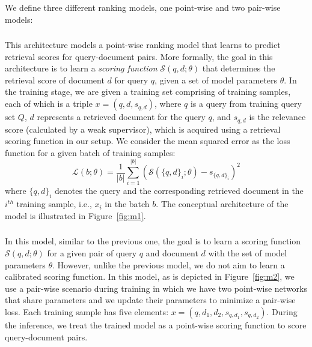We define three different ranking models, one point-wise and two pair-wise models:

\subsubsection{\label{sec:modelone}\ModelOne} 
This architecture models a point-wise ranking model that learns to predict retrieval scores for query-document pairs. More formally, the goal in this architecture is to learn a \emph{scoring function} $\mathcal{S}(q, d; \theta)$ that determines the retrieval score of document $d$ for query $q$, given a set of model parameters $\theta$.
%
In the training stage, we are given a training set comprising of training samples, each of which is a triple $x = (q,d, s_{q,d})$, where $q$ is a query from training query set $Q$, $d$ represents a retrieved document for the query $q$, and $s_{q,d}$ is the relevance score (calculated by a weak supervisor), which is acquired using a retrieval scoring function in our setup.
%
We consider the mean squared error as the loss function for a given batch of training samples:
\begin{equation}
\mathcal{L}(b; \theta) = \frac{1}{|b|} \sum_{i=1}^{|b|}{(\mathcal{S}(\{q, d\}_i; \theta) - s_{\{q, d\}_i})^2}
\end{equation}
where $\{q, d\}_i$ denotes the query and the corresponding retrieved document in the $i^{th}$ training sample, i.e., $x_i$ in the batch $b$.
The conceptual architecture of the model is illustrated in Figure~\ref{fig:m1}.


\subsubsection{\label{sec:modeltwo}\ModelTwo}
In this model, similar to the previous one, the goal is to learn a scoring function $\mathcal{S}(q, d; \theta)$ for a given pair of query $q$ and document $d$ with the set of model parameters $\theta$. 
However, unlike the previous model, we do not aim to learn a calibrated scoring function. 
In this model, as is depicted in Figure~\ref{fig:m2}, we use a pair-wise scenario during training in which we have two point-wise networks that share parameters and we update their parameters to minimize a pair-wise loss.
Each training sample has five elements: $x = (q,d_1, d_2, s_{q,d_1}, s_{q,d_2})$.
During the inference, we treat the trained model as a point-wise scoring function to score query-document pairs.

